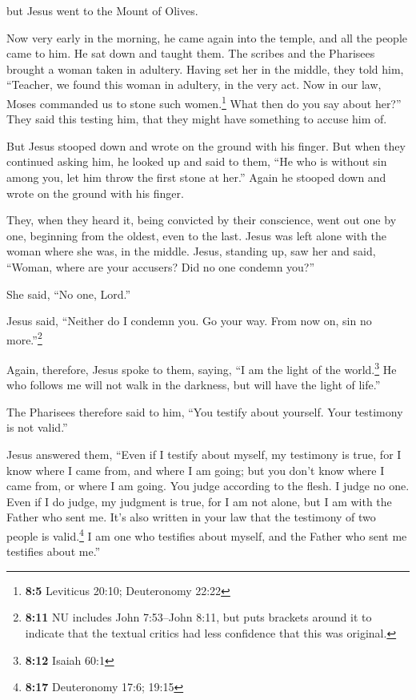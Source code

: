 but Jesus went to the Mount of Olives.

 Now very early in the morning, he came again into the
temple, and all the people came to him. He sat down and taught them.
 The scribes and the Pharisees brought a woman taken in
adultery. Having set her in the middle,  they told him,
``Teacher, we found this woman in adultery, in the very act.
 Now in our law, Moses commanded us to stone such
women.\footnote{\textbf{8:5} Leviticus 20:10; Deuteronomy 22:22} What
then do you say about her?''  They said this testing him,
that they might have something to accuse him of.

But Jesus stooped down and wrote on the ground with his finger.
 But when they continued asking him, he looked up and said
to them, ``He who is without sin among you, let him throw the first
stone at her.''  Again he stooped down and wrote on the
ground with his finger.

 They, when they heard it, being convicted by their
conscience, went out one by one, beginning from the oldest, even to the
last. Jesus was left alone with the woman where she was, in the middle.
 Jesus, standing up, saw her and said, ``Woman, where are
your accusers? Did no one condemn you?''

 She said, ``No one, Lord.''

Jesus said, ``Neither do I condemn you. Go your way. From now on, sin no
more.''\footnote{\textbf{8:11} NU includes John 7:53--John 8:11, but
  puts brackets around it to indicate that the textual critics had less
  confidence that this was original.}

 Again, therefore, Jesus spoke to them, saying, ``I am
the light of the world.\footnote{\textbf{8:12} Isaiah 60:1} He who
follows me will not walk in the darkness, but will have the light of
life.''

 The Pharisees therefore said to him, ``You testify about
yourself. Your testimony is not valid.''

 Jesus answered them, ``Even if I testify about myself,
my testimony is true, for I know where I came from, and where I am
going; but you don't know where I came from, or where I am going.
 You judge according to the flesh. I judge no one.
 Even if I do judge, my judgment is true, for I am not
alone, but I am with the Father who sent me.  It's also
written in your law that the testimony of two people is
valid.\footnote{\textbf{8:17} Deuteronomy 17:6; 19:15}  I
am one who testifies about myself, and the Father who sent me testifies
about me.''

